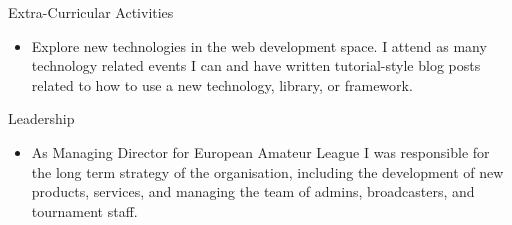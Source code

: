 \documentclass{resume} %
\begin{document}
\begin{rSection}{Extra-Curricular Activities}
\begin{itemize}
    \item Explore new technologies in the web development space. I attend as many technology related events I can and have written tutorial-style blog posts related to how to use a new technology, library, or framework.
\end{itemize}


\end{rSection}

\begin{rSection}{Leadership}
\begin{itemize}
    \item As Managing Director for European Amateur League I was responsible for the long term strategy of the organisation, including the development of new products, services, and managing the team of admins, broadcasters, and tournament staff.
\end{itemize}


\end{rSection}
\end{document}

